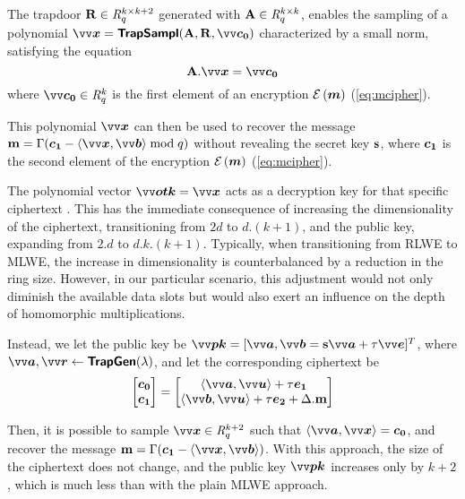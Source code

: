 The trapdoor $\mathbf{R} \in \mathit{R}_q^{k\times k+2}$ generated with $\mathbf{A} \in \mathit{R}_q^{k\times k}$, enables the sampling of a polynomial $\pv{x} = \bkw{TrapSampl}(\pA,\pR,\pv{c_0})$ characterized by a small norm, satisfying the equation 
\begin{equation}\label{eq:unvailabletrap}
    \pA.\pv{x}=\pv{c_0}
\end{equation}
where $\pv{c_0} \in \intring^k_q$ is the first element of an encryption $\mathcal{E}\left({\bm{m}}\right)$ (\cref{eq:mcipher}).

This polynomial $\pv{x}$ can then be used to recover the message $\ppm=\Gamma(\p{c_1}-\inprod{\pv{x}}{\pv{b}} \bmod q)$ without revealing the secret key $\mathbf{s}$, where $\bm{c_1}$ is the second element of the encryption $\mathcal{E}\left({\bm{m}}\right)$ (\cref{eq:mcipher}).

The polynomial vector $\pv{otk}=\pv{x}$ acts as a decryption key for that specific ciphertext \cite{chillottiHomomorphicLWEBased2016}.
This has the immediate consequence of increasing the dimensionality of the ciphertext, transitioning from $2d$ to $d.(k + 1)$, and the public key, expanding from $2.d$ to $d.k.(k + 1)$. Typically, when transitioning from \ac{RLWE} to \ac{MLWE}, the increase in dimensionality is counterbalanced by a reduction in the ring size. However, in our particular scenario, this adjustment would not only diminish the available data slots but would also exert an influence on the depth of homomorphic multiplications.

Instead, we let the public key be $\pv{pk}=[\pv{a},\pv{b}=\ps\pv{a}+\tau\pv{e}]^T$, where $\pv{a},\pv{r} \from \bkw{TrapGen}(\lambda)$, and let the corresponding ciphertext be
\begin{equation}\label{eq:otkcipher}
\begin{bmatrix}\p{c_0}\\\p{c_1}\end{bmatrix}=\begin{bmatrix}\inprod{\pv{a}}{\pv{u}}+\tau\p{e_1}\\\inprod{\pv{b}}{\pv{u}}+\tau\p{e_2}+\Delta.\ppm\end{bmatrix}
\end{equation}

Then, it is possible to sample $\pv{x} \in \intring_q^{k+2}$ such that $\inprod{\pv{a}}{\pv{x}}=\p{c_0}$, and recover the message $\ppm=\Gamma(\p{c_1}-\inprod{\pv{x}}{\pv{b}})$.
With this approach, the size of the ciphertext does not change, and the public key $\pv{pk}$ increases only by $k+2$, which is much less than with the plain \ac{MLWE} approach.


